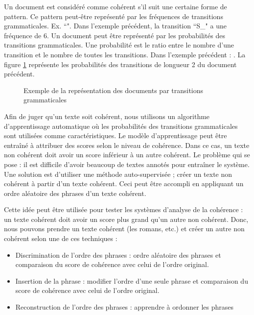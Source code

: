 \documentclass{KodeBook}
\begin{document}
Un document est considéré comme cohérent s'il suit une certaine forme de pattern.
Ce pattern peut-être représenté par les fréquences de transitions grammaticales. Ex. ``".
Dans l'exemple précédent, la transition ``S\_" a une fréquence de 6.
Un document peut être représenté par les probabilités des transitions grammaticales.
Une probabilité est le ratio entre le nombre d'une transition et le nombre de toutes les transitions.
Dans l'exemple précédent : .
La figure \ref{fig:entity-grid-prob} représente les probabilités des transitions de longueur 2 du document précédent.

\begin{figure}[!ht]
	\centering
	\caption[Exemple de la représentation des documents par transitions grammaticales]{Exemple de la représentation des documents par transitions grammaticales \cite{2008-barzilay-lapata}}
	\label{fig:entity-grid-prob}
\end{figure}

Afin de juger qu'un texte soit cohérent, nous utilisons un algorithme d'apprentissage automatique où les probabilités des transitions grammaticales sont utilisées comme caractéristiques. 
Le modèle d'apprentissage peut être entraîné à attribuer des scores selon le niveau de cohérence.
Dans ce cas, un texte non cohérent doit avoir un score inférieur à un autre cohérent.
Le problème qui se pose : il est difficile d'avoir beaucoup de textes annotés pour entraîner le système.
Une solution est d'utiliser une méthode auto-supervisée ; créer un texte non cohérent à partir d'un texte cohérent. 
Ceci peut être accompli en appliquant un ordre aléatoire des phrases d'un texte cohérent. 

Cette idée peut être utilisée pour tester les systèmes d'analyse de la cohérence : un texte cohérent doit avoir un score plus grand qu'un autre non cohérent. 
Donc, nous pouvons prendre un texte cohérent (les romans, etc.) et créer un autre non cohérent selon une de ces techniques :
\begin{itemize}
	\item Discrimination de l'ordre des phrases : ordre aléatoire des phrases et comparaison du score de cohérence avec celui de l'ordre original.
	\item Insertion de la phrase : modifier l'ordre d'une seule phrase et comparaison du score de cohérence avec celui de l'ordre original.
	\item Reconstruction de l'ordre des phrases : apprendre à ordonner les phrases
\end{itemize}
\end{document}
